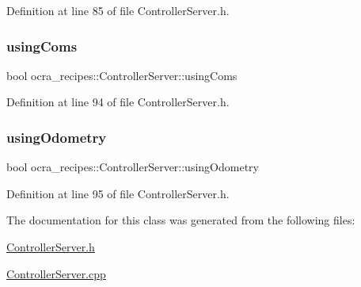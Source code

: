 Definition at line 85 of file Controller\+Server.\+h.

\hypertarget{classocra__recipes_1_1ControllerServer_a7f7559e938ca0e3cfff4833d86ef5b54}{}\label{classocra__recipes_1_1ControllerServer_a7f7559e938ca0e3cfff4833d86ef5b54} 
\subsubsection{\texorpdfstring{using\+Coms}{usingComs}}
{\footnotesize\ttfamily bool ocra\+\_\+recipes\+::\+Controller\+Server\+::using\+Coms\hspace{0.3cm}{\ttfamily [protected]}}



Definition at line 94 of file Controller\+Server.\+h.

\hypertarget{classocra__recipes_1_1ControllerServer_afd126a8b289e29213468fe9e9a800dd2}{}\label{classocra__recipes_1_1ControllerServer_afd126a8b289e29213468fe9e9a800dd2} 
\subsubsection{\texorpdfstring{using\+Odometry}{usingOdometry}}
{\footnotesize\ttfamily bool ocra\+\_\+recipes\+::\+Controller\+Server\+::using\+Odometry\hspace{0.3cm}{\ttfamily [protected]}}



Definition at line 95 of file Controller\+Server.\+h.



The documentation for this class was generated from the following files\+:\begin{DoxyCompactItemize}
\item 
\hyperlink{ControllerServer_8h}{Controller\+Server.\+h}\item 
\hyperlink{ControllerServer_8cpp}{Controller\+Server.\+cpp}\end{DoxyCompactItemize}

